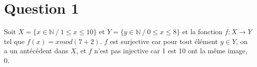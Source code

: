 \section*{Question 1}

Soit $X = \{ x \in \mathbb{N} \ / \ 1 \leq x \leq 10\}$ et   $Y = \{ y \in \mathbb{N} \ / \ 0 \leq x \leq 8\}$ et la fonction $f : X \rightarrow Y$ tel que $f(x) = x mod (7 + 2)$. $f$ est surjective car pour tout élément $y \in Y$, on a un antécédent dans $X$, et $f$ n’est pas injective car 1 est 10 ont la même image, 0.

